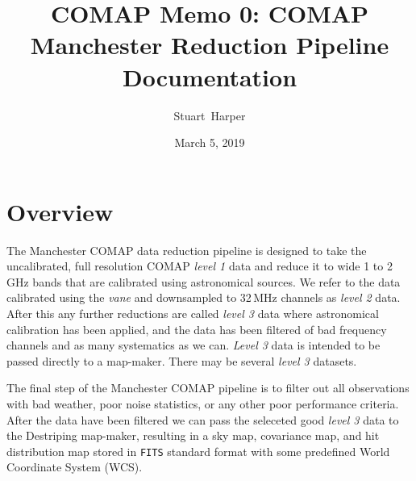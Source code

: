 \documentclass[11pt]{article}
\begin{document}
\title[COMAP reduce docs]{\bf COMAP Memo 0: COMAP Manchester Reduction Pipeline Documentation}
\author{Stuart~Harper}
\date{March 5, 2019}
\setlength{\topmargin}{-15mm}

\maketitle

\tableofcontents
\newpage

\section{Overview}

The Manchester COMAP data reduction pipeline is designed to take the uncalibrated, full resolution COMAP \textit{level 1} data and reduce it to wide 1 to 2\,GHz bands that are calibrated using astronomical sources. We refer to the data calibrated using the \textit{vane} and downsampled to 32\,MHz channels as \textit{level 2} data. After this any further reductions are called \textit{level 3} data where astronomical calibration has been applied, and the data has been filtered of bad frequency channels and as many systematics as we can. \textit{Level 3} data is intended to be passed directly to a map-maker. There may be several \textit{level 3} datasets.

The final step of the Manchester COMAP pipeline is to filter out all observations with bad weather, poor noise statistics, or any other poor performance criteria. After the data have been filtered we can pass the seleceted good  \textit{level 3} data to the Destriping map-maker, resulting in a sky map, covariance map, and hit distribution map stored in \texttt{FITS} standard format with some predefined World Coordinate System (WCS).
\end{document}
